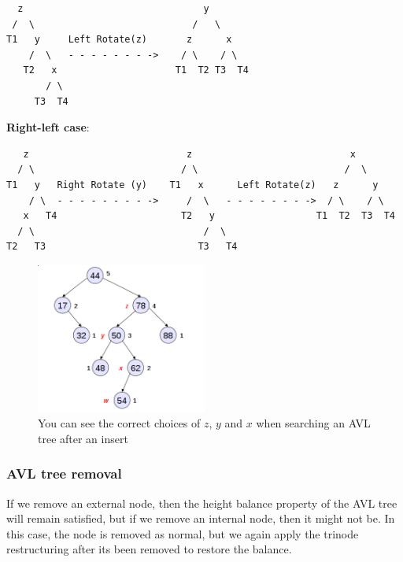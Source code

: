 \begin{itemize}
\begin{description}
      \begin{verbatim}
  z                                y
 /  \                            /   \ 
T1   y     Left Rotate(z)       z      x
    /  \   - - - - - - - ->    / \    / \
   T2   x                     T1  T2 T3  T4
       / \
     T3  T4
      \end{verbatim}
    \item \textbf{Right-left case}:\\
      \begin{verbatim}
   z                            z                            x
  / \                          / \                          /  \ 
T1   y   Right Rotate (y)    T1   x      Left Rotate(z)   z      y
    / \  - - - - - - - - ->     /  \   - - - - - - - ->  / \    / \
   x   T4                      T2   y                  T1  T2  T3  T4
  / \                              /  \
T2   T3                           T3   T4
      \end{verbatim}
  \end{description}
\end{itemize}

\begin{figure}[H]
  \centering
  \includegraphics[width=0.5\textwidth]{images/avl-tree-stage-1}
  \caption{You can see the correct choices of $z$, $y$ and $x$ when searching an
  AVL tree after an insert}
  \label{avl-tree-stage-1}
\end{figure}

\subsubsection{AVL tree removal}

If we remove an external node, then the height balance property of the AVL tree
will remain satisfied, but if we remove an internal node, then it might not be.
In this case, the node is removed as normal, but we again apply the trinode
restructuring after its been removed to restore the balance.

